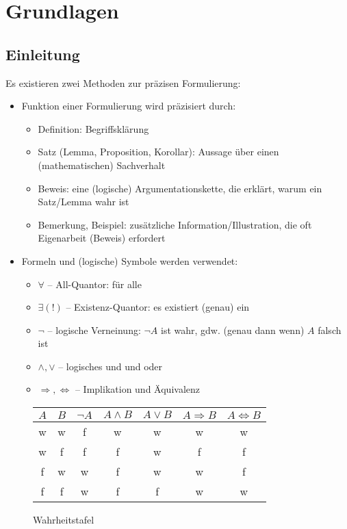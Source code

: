 \chapter*{Grundlagen}
\section*{Einleitung}
	Es existieren zwei Methoden zur präzisen Formulierung:
	\begin{itemize}
	\item Funktion einer Formulierung wird präzisiert durch:
		\begin{itemize}
			\item Definition: Begriffsklärung
			\item Satz (Lemma, Proposition, Korollar): Aussage über einen (mathematischen) Sachverhalt
			\item Beweis: eine (logische) Argumentationskette, die erklärt, warum ein Satz/Lemma wahr ist
			\item Bemerkung, Beispiel: zusätzliche Information/Illustration, die oft Eigenarbeit (Beweis) erfordert
		\end{itemize}
	\item Formeln und (logische) Symbole werden verwendet:
		\begin{itemize}
			\item $\forall$ -- All-Quantor: \glqq für alle\grqq
			\item $\exists(!)$ -- Existenz-Quantor: \glqq es existiert (genau) ein\grqq
			\item $\lnot$ -- logische Verneinung: $\lnot A$ ist wahr, gdw. (genau dann wenn) $A$ falsch ist
			\item $\land ,\lor$ -- logisches \glqq und\grqq{} und \glqq oder\grqq
			\item $\Rightarrow ,\Leftrightarrow$ -- Implikation und Äquivalenz
		\end{itemize}
	\end{itemize}

	\begin{figure}[H]\centering
		\begin{tabular}{c|c|c|c|c|c|c}
			$A$ & $B$ & $\lnot A$ & $A\land B$ &$A\lor B$&$A \Rightarrow B$ & $A\Leftrightarrow B$\\\hline
			w & w & f & w & w & w & w\\
			w & f & f & f & w & f & f\\
			f & w & w & f & w & w & f\\
			f & f & w & f & f & w & w\\
		\end{tabular}
	\caption{Wahrheitstafel}
	\end{figure}

